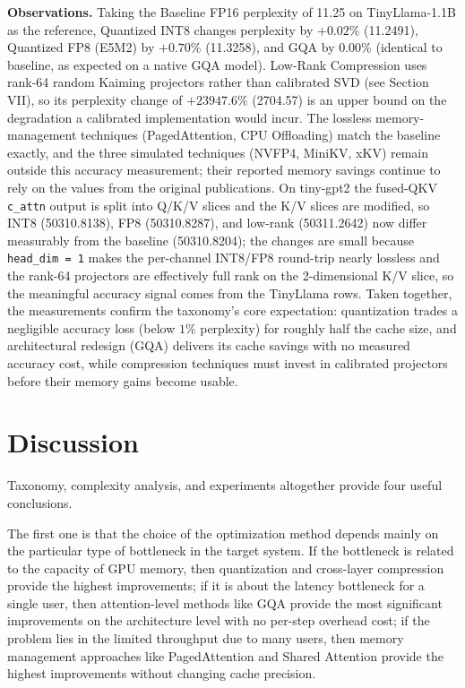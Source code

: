 \documentclass[conference]{IEEEtran}
\begin{document}
\noindent\textbf{Observations.} Taking the Baseline FP16 perplexity of 11.25 on TinyLlama-1.1B as the reference, Quantized INT8 changes perplexity by $+0.02$\% (11.2491), Quantized FP8 (E5M2) by $+0.70$\% (11.3258), and GQA by $0.00$\% (identical to baseline, as expected on a native GQA model). Low-Rank Compression uses rank-64 random Kaiming projectors rather than calibrated SVD (see Section VII), so its perplexity change of $+23947.6$\% (2704.57) is an upper bound on the degradation a calibrated implementation would incur. The lossless memory-management techniques (PagedAttention, CPU Offloading) match the baseline exactly, and the three simulated techniques (NVFP4, MiniKV, xKV) remain outside this accuracy measurement; their reported memory savings continue to rely on the values from the original publications. On tiny-gpt2 the fused-QKV \texttt{c\_attn} output is split into Q/K/V slices and the K/V slices are modified, so INT8 (50310.8138), FP8 (50310.8287), and low-rank (50311.2642) now differ measurably from the baseline (50310.8204); the changes are small because \texttt{head\_dim = 1} makes the per-channel INT8/FP8 round-trip nearly lossless and the rank-64 projectors are effectively full rank on the 2-dimensional K/V slice, so the meaningful accuracy signal comes from the TinyLlama rows. Taken together, the measurements confirm the taxonomy's core expectation: quantization trades a negligible accuracy loss (below $1$\% perplexity) for roughly half the cache size, and architectural redesign (GQA) delivers its cache savings with no measured accuracy cost, while compression techniques must invest in calibrated projectors before their memory gains become usable.

\section{Discussion}
\label{sec:discussion}

Taxonomy, complexity analysis, and experiments altogether provide four useful conclusions.

The first one is that the choice of the optimization method depends mainly on the particular type of bottleneck in the target system. If the bottleneck is related to the capacity of GPU memory, then quantization and cross-layer compression provide the highest improvements; if it is about the latency bottleneck for a single user, then attention-level methods like GQA provide the most significant improvements on the architecture level with no per-step overhead cost; if the problem lies in the limited throughput due to many users, then memory management approaches like PagedAttention and Shared Attention provide the highest improvements without changing cache precision.
\end{document}
